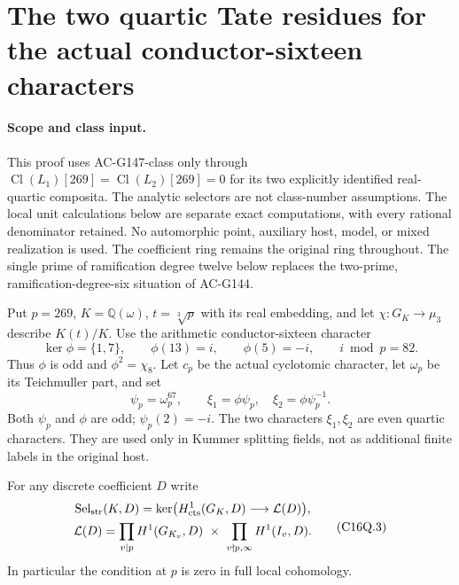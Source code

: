 \section{The two quartic Tate residues for the actual conductor-sixteen characters}
\label{sec:conductor16-quartic-residue-strict}

\paragraph{Scope and class input.}
This proof uses AC-G147-class only through
$\operatorname{Cl}(L_1)[269]=\operatorname{Cl}(L_2)[269]=0$
for its two explicitly identified real-quartic composita.
The analytic selectors are not class-number assumptions.
The local unit calculations below are separate exact computations,
with every rational denominator retained.
No automorphic point, auxiliary host, model, or mixed realization is used.
The coefficient ring remains the original ring throughout.
The single prime of ramification degree twelve below replaces the
two-prime, ramification-degree-six situation of AC-G144.

Put $p=269$, $K=\mathbb Q(\omega)$, $t=\sqrt[3]{p}$ with its
real embedding, and let $\chi:G_K\to\mu_3$ describe $K(t)/K$.
Use the arithmetic conductor-sixteen character
\[
 \ker\phi=\{1,7\},\qquad \phi(13)=i,\qquad
 \phi(5)=-i,\qquad i\bmod p=82 .
 \tag{C16Q.1}
\]
Thus $\phi$ is odd and $\phi^2=\chi_8$.
Let $c_p$ be the actual cyclotomic character, let $\omega_p$ be
its Teichmuller part, and set
\[
                  \psi_p=\omega_p^{67},\qquad
                  \xi_1=\phi\psi_p,\quad \xi_2=\phi\psi_p^{-1}.
 \tag{C16Q.2}
\]
Both $\psi_p$ and $\phi$ are odd; $\psi_p(2)=-i$.
The two characters $\xi_1,\xi_2$ are even quartic characters.
They are used only in Kummer splitting fields, not as additional
finite labels in the original host.

For any discrete coefficient $D$ write
\[
 \begin{gathered}
 \operatorname{Sel}_{\rm str}(K,D)=
 \ker\bigl(H^1_{\rm cts}(G_K,D)\longrightarrow\mathcal L(D)\bigr),\\
 \mathcal L(D)=
 \prod_{v\mid p}H^1(G_{K_v},D)\ \times\
 \prod_{v\nmid p,\infty}H^1(I_v,D).
 \end{gathered}
 \tag{C16Q.3}
\]
In particular the condition at $p$ is zero in full local cohomology.

